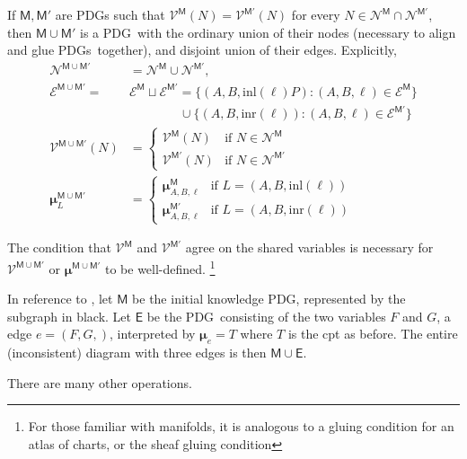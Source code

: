 \documentclass{article}
\newcommand{\notation}[2][]{#1}
\renewcommand{\notation}[2][]{{\color{notationcolor} #2}}
\newcommand{\vfullfootnote}[1]{}
\renewcommand{\vfullfootnote}[1]{\footnote{#1}}
\newcommand{\bmu}{\boldsymbol{\mu}}
\newcommand{\V}{\mathcal V}
\newcommand{\N}{\mathcal N}
\newcommand{\Ed}{\mathcal E}
\newcommand{\sfM}{\mathsf M}
\newcommand{\MN}{PDG}
\newcommand{\MNs}{\MN s}
\numberwithin{equation}{section}
\begin{document}
{	\begin{defn}[union] \label{def:model-union}
		If $\sfM, \sfM'$ are \MN s such that $\V^\sfM(N) = \V^{\sfM'}(N)$ for every $N \in  \N^{\sfM} \cap \N^{\sfM'}$, then $\sfM \cup \sfM'$ is a \MN\ with the ordinary union of their nodes (necessary to align and glue \MNs\ together), and disjoint union of their edges. \notation{Explicitly,
		\begin{align*}
			\N^{\sfM \cup \sfM'} &= \N^\sfM \cup \N^{\sfM'},  \\
			\Ed^{\sfM \cup \sfM'} \!=& \Ed^\sfM \sqcup \Ed^{\sfM'}\!
				=  \{ (A, B, \text{inl}(\ell)P) : (A,B,\ell)\in \Ed^\sfM \}  \\
					&\qquad\qquad \cup \{ (A, B, \text{inr}(\ell)) : (A,B,\ell)\in \Ed^{\sfM'} \} \\ 
			\V^{\sfM \cup \sfM'} (N) &= \begin{cases}
					\V^{\sfM}(N) & \text{if }N \in \N^\sfM \\
					\V^{\sfM'}(N) &\text{if }N \in \N^{\sfM'} 
				\end{cases}\\
			\bmu^{\sfM \cup \sfM'}_L &= \begin{cases}
				\bmu^{\sfM}_{A, B, \ell} &\text{if } L = (A, B, \text{inl} (\ell)) \\
				\bmu^{\sfM'}_{A, B, \ell} &\text{if } L = (A, B, \text{inr} (\ell)) 
			\end{cases}
		\end{align*}}
	\end{defn}
	The condition that $\V^\sfM$ and $\V^{\sfM'}$ agree on the shared variables is necessary for $\V^{\sfM\cup \sfM'}$ or $\bmu^{\sfM \cup \sfM'}$ to be well-defined.%
		\vfullfootnote{For those familiar with manifolds, it is analogous to a gluing condition for an atlas of charts, or the sheaf gluing condition}
	
	\begin{example}[continues=ex:guns-and-floomps]
		In reference to , let $\sfM$ be the initial knowledge \MN, represented by the subgraph 
		in black. Let $\mathsf E$ be the \MN\ consisting of the two variables $F$ and $G$, a edge $e = (F, G,)$, interpreted by $\bmu_{e} = T$ where $T$ is the cpt as before. The entire (inconsistent) diagram with three edges is then
		$ \sfM \cup \mathsf E$.
	\end{example}

	There are many other operations. 
}
\end{document}
